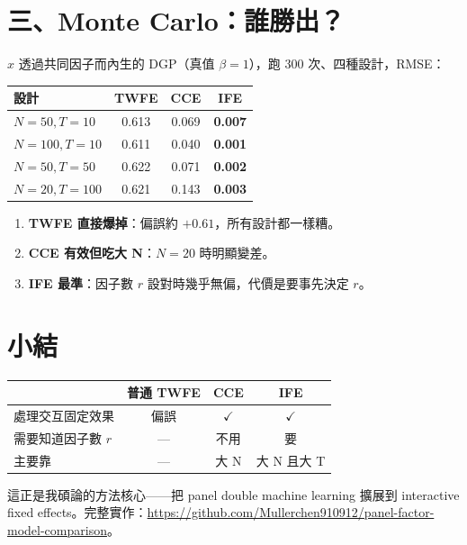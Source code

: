 \documentclass[12pt, a4paper]{article}
\begin{document}
\section{三、Monte Carlo：誰勝出？}

$x$ 透過共同因子而內生的 DGP（真值 $\beta = 1$），跑 300 次、四種設計，RMSE：

\begin{center}
\begin{tabular}{lccc}
\toprule
設計 & TWFE & CCE & IFE \\
\midrule
$N=50, T=10$ & 0.613 & 0.069 & \textbf{0.007} \\
$N=100, T=10$ & 0.611 & 0.040 & \textbf{0.001} \\
$N=50, T=50$ & 0.622 & 0.071 & \textbf{0.002} \\
$N=20, T=100$ & 0.621 & 0.143 & \textbf{0.003} \\
\bottomrule
\end{tabular}
\end{center}

\begin{enumerate}
  \item \textbf{TWFE 直接爆掉}：偏誤約 $+0.61$，所有設計都一樣糟。
  \item \textbf{CCE 有效但吃大 N}：$N=20$ 時明顯變差。
  \item \textbf{IFE 最準}：因子數 $r$ 設對時幾乎無偏，代價是要事先決定 $r$。
\end{enumerate}

\section{小結}

\begin{center}
\begin{tabular}{lccc}
\toprule
 & 普通 TWFE & CCE & IFE \\
\midrule
處理交互固定效果 & 偏誤 & $\checkmark$ & $\checkmark$ \\
需要知道因子數 $r$ & --- & 不用 & 要 \\
主要靠 & --- & 大 N & 大 N 且大 T \\
\bottomrule
\end{tabular}
\end{center}

這正是我碩論的方法核心——把 panel double machine learning 擴展到 interactive fixed effects。完整實作：\url{https://github.com/Mullerchen910912/panel-factor-model-comparison}。
\end{document}
